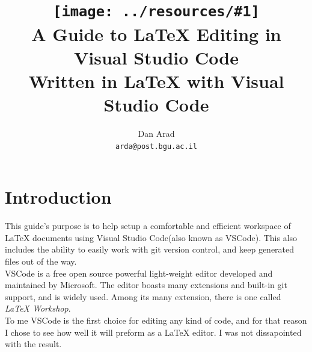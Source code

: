 \documentclass{article}
\newcommand{\latex}{\LaTeX\xspace}
\newcommand{\email}[1]{\texttt{#1}}
\newcommand{\icon}[2]{\texttt{[image: ../resources/\#1]}\xspace}
\begin{document}
\title{
	\icon{vscode_icon.png}{0.05}\\
	A Guide to \latex Editing in Visual Studio Code\\
	\large Written in \latex with Visual Studio Code
}
\author{
	Dan Arad\\
	\email{arda@post.bgu.ac.il}
}
\maketitle

\section{Introduction} \label{sec:introduction}
This guide's purpose is to help setup a comfortable and efficient workspace of \latex documents using Visual Studio Code\footnotemark[1] (also known as VSCode). This also includes the ability to easily work with git version control, and keep generated files out of the way.\\
VSCode is a free open source powerful light-weight editor developed and maintained by Microsoft. The editor boasts many extensions and built-in git support, and is widely used. Among its many extension, there is one called \emph{\latex Workshop}\footnotemark[2].\\
To me VSCode is the first choice for editing any kind of code, and for that reason I chose to see how well it will preform as a \latex editor. I was not dissapointed with the result.

\end{document}
